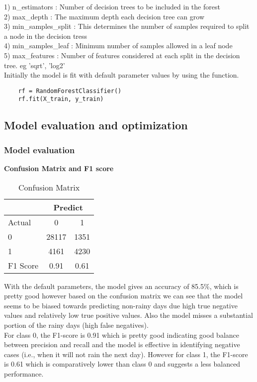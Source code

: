 \documentclass[10pt]{article}
\begin{document}
1) n\_estimators : Number of decision trees to be included in the forest\\
2) max\_depth : The maximum depth each decision tree can grow\\
3) min\_samples\_split : This determines the number of samples required to split a node in the decision tress\\
4) min\_samples\_leaf : Minimum number of samples allowed in a leaf node\\
5) max\_features : Number of features considered at each split in the decision tree. eg 'sqrt', 'log2'\\

Initially the model is fit with default parameter values by using the function.
\begin{verbatim}
    rf = RandomForestClassifier()
    rf.fit(X_train, y_train)
\end{verbatim} 


\subsection{Model evaluation and optimization}
\subsubsection{Model evaluation}
\textbf{Confusion Matrix and F1 score}

\begin{table}[h]
    \centering
    \begin{tabular}{|l|c|c|} \hline 
  &\multicolumn{2}{|c|}{Predict}\\ \hline 
          Actual&0&  1\\ \hline 
          0&28117&  1351\\ \hline 
          1&4161&  4230\\ \hline
 F1 Score& 0.91&0.61\\\hline
    \end{tabular}
                \caption{Confusion Matrix}
\label{Confusion Matrix- krishna}
\end{table}

With the default parameters, the model gives an accuracy of 85.5\%, which is pretty good however based on the confusion matrix we can see that the model seems to be biased towards predicting non-rainy days due high true negative values and relatively low true positive values. Also the model misses a substantial portion of the rainy days (high false negatives). \\
For class 0, the F1-score is 0.91 which is pretty good indicating good balance between precision and recall and the model is effective in identifying negative cases (i.e., when it will not rain the next day). However for class 1, the F1-score is 0.61 which is comparatively lower than class 0 and suggests a less balanced performance. 
\end{document}
